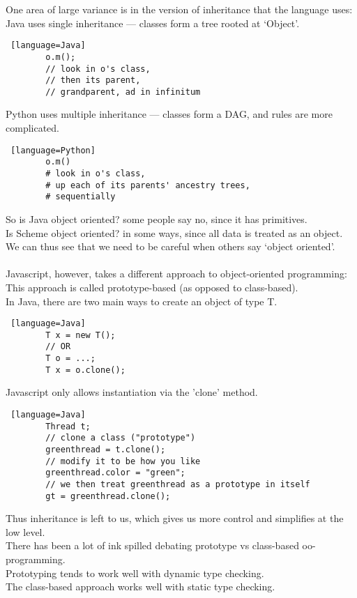 \documentclass[../../lecture_notes.tex]{subfiles}
\begin{document}
One area of large variance is in the version of inheritance that the language uses:
\indent Java uses single inheritance — classes form a tree rooted at ‘Object’.
	\begin{lstlisting} [language=Java]
		o.m(); 
		// look in o's class, 
		// then its parent, 
		// grandparent, ad in infinitum
	\end{lstlisting}
\indent  Python uses multiple inheritance — classes form a DAG, and rules are more complicated.
	\begin{lstlisting} [language=Python]
		o.m()
		# look in o's class, 
		# up each of its parents' ancestry trees, 
		# sequentially
	\end{lstlisting}
So is Java object oriented? some people say no, since it has primitives.\\
Is Scheme object oriented? in some ways, since all data is treated as an object.\\
We can thus see that we need to be careful when others say ‘object oriented’.\\
\\
\noindent Javascript, however, takes a different approach to object-oriented programming:\\
\indent This approach is called prototype-based (as opposed to class-based).\\
\indent In Java, there are two main ways to create an object of type T.
	\begin{lstlisting} [language=Java]
		T x = new T();
		// OR
		T o = ...;
		T x = o.clone();
	\end{lstlisting}
	\indent \indent Javascript only allows instantiation via the 'clone' method.
	\begin{lstlisting} [language=Java]
		Thread t;
		// clone a class ("prototype")
		greenthread = t.clone();
		// modify it to be how you like
		greenthread.color = "green";
		// we then treat greenthread as a prototype in itself
		gt = greenthread.clone();
	\end{lstlisting}
	\indent Thus inheritance is left to us, which gives us more control and simplifies at the low level.\\
There has been a lot of ink spilled debating prototype vs class-based oo-programming.\\
\indent Prototyping tends to work well with dynamic type checking.\\
\indent The class-based approach works well with static type checking.\\
\\
\end{document}
